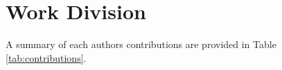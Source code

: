 \documentclass[10pt,twocolumn,letterpaper]{article}
\begin{document}




\section{Work Division}

A summary of each authors contributions are provided in Table \ref{tab:contributions}.








\end{document}
